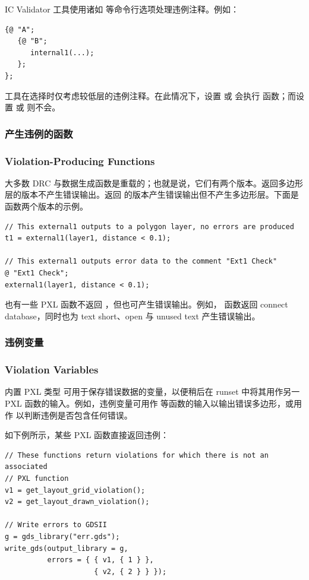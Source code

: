 IC Validator 工具使用诸如  等命令行选项处理违例注释。例如：
\begin{lstlisting}[style=pxl]
{@ "A";
   {@ "B";
      internal1(...);
   };
};
\end{lstlisting}

工具在选择时仅考虑较低层的违例注释。在此情况下，设置  或  会执行  函数；而设置  或  则不会。

\subsubsection{产生违例的函数}
\subsubsection*{Violation-Producing Functions}

大多数 DRC 与数据生成函数是重载的；也就是说，它们有两个版本。返回多边形层的版本不产生错误输出。返回  的版本产生错误输出但不产生多边形层。下面是  函数两个版本的示例。
\begin{lstlisting}[style=pxl]
// This external1 outputs to a polygon layer, no errors are produced
t1 = external1(layer1, distance < 0.1);

// This external1 outputs error data to the comment "Ext1 Check"
@ "Ext1 Check";
external1(layer1, distance < 0.1);
\end{lstlisting}

也有一些 PXL 函数不返回 ，但也可产生错误输出。例如， 函数返回 connect database，同时也为 text short、open 与 unused text 产生错误输出。

\subsubsection{违例变量}
\subsubsection*{Violation Variables}

内置 PXL 类型  可用于保存错误数据的变量，以便稍后在 runset 中将其用作另一 PXL 函数的输入。例如，违例变量可用作  等函数的输入以输出错误多边形，或用作  以判断违例是否包含任何错误。

如下例所示，某些 PXL 函数直接返回违例：
\begin{lstlisting}[style=pxl]
// These functions return violations for which there is not an associated
// PXL function
v1 = get_layout_grid_violation();
v2 = get_layout_drawn_violation();

// Write errors to GDSII
g = gds_library("err.gds");
write_gds(output_library = g,
          errors = { { v1, { 1 } },
                     { v2, { 2 } } });
\end{lstlisting}

